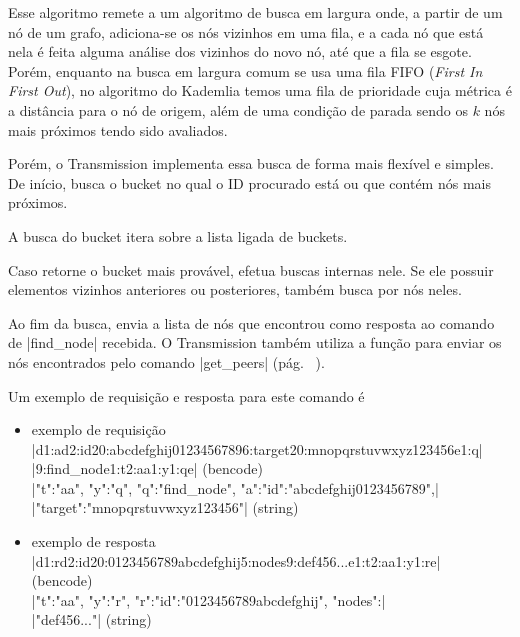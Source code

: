 Esse algoritmo remete a um algoritmo de busca em largura onde, a partir de um nó de um
grafo, adiciona-se os nós vizinhos em uma fila, e a cada nó que está nela é feita alguma
análise dos vizinhos do novo nó, até que a fila se esgote. Porém, enquanto na busca em
largura comum se usa uma fila FIFO (\emph{First In First Out}), no algoritmo do Kademlia
temos uma fila de prioridade cuja métrica é a distância para o nó de origem, além de uma
condição de parada sendo os $k$ nós mais próximos tendo sido avaliados.

Porém, o Transmission implementa essa busca de forma mais flexível e simples. De início,
busca o \gls*{bucket} no qual o ID procurado está ou que contém nós mais próximos.


A busca do \gls*{bucket} itera sobre a lista ligada de \glspl*{bucket}.


Caso retorne o \gls*{bucket} mais provável, efetua buscas internas nele. Se ele possuir
elementos vizinhos anteriores ou posteriores, também busca por nós neles.


Ao fim da busca, envia a lista de nós que encontrou como resposta ao comando de
\bverb|find_node| recebida. O Transmission também utiliza a função para enviar os nós
encontrados pelo comando \bverb|get_peers| (pág. ~\pageref{subsubsubsec:getpeers}).


Um exemplo de requisição e resposta para este comando é

\begin{itemize}
    \item exemplo de requisição \\
        \bverb|d1:ad2:id20:abcdefghij01234567896:target20:mnopqrstuvwxyz123456e1:q| \\
        \bverb|9:find_node1:t2:aa1:y1:qe| (\gls*{bencode}) \\
        \sverb|{"t":"aa", "y":"q", "q":"find_node", "a":{"id":"abcdefghij0123456789",| \\
        \sverb|"target":"mnopqrstuvwxyz123456"}}| (\gls*{string})

    \item exemplo de resposta \\
        \bverb|d1:rd2:id20:0123456789abcdefghij5:nodes9:def456...e1:t2:aa1:y1:re| \\
        (\gls*{bencode}) \\
        \sverb|{"t":"aa", "y":"r", "r":{"id":"0123456789abcdefghij", "nodes":| \\
        \sverb|"def456..."}}| (\gls*{string})
\end{itemize}